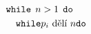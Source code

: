 \documentclass[preview]{standalone}
\begin{document}
\begin{align*}
\mathtt{while}& \:\: n > 1 \:\: \mathtt{do}\\&\hspace*{-16pt}\mathtt{while} p_i \text{ dělí } n \mathtt{do}
\end{align*}
\end{document}
